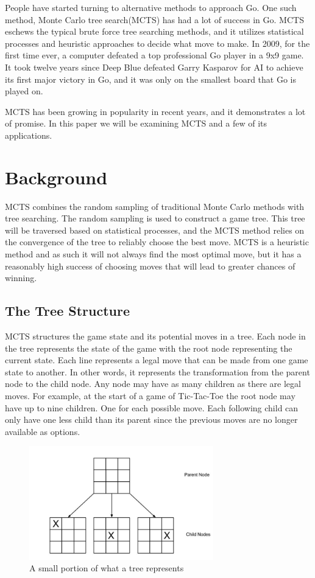 \documentclass{sig-alternate}
\begin{document}
People have started turning to alternative methods to approach Go. One such method, Monte Carlo tree search(MCTS) has had a lot of success in Go. MCTS eschews the typical brute force tree searching methods, and it utilizes statistical processes and heuristic approaches to decide what move to make. In 2009, for the first time ever, a computer defeated a top professional Go player in a 9x9 game\cite{TheGrandChallenge}. It took twelve years since Deep Blue defeated Garry Kasparov for AI to achieve its first major victory in Go, and it was only on the smallest board that Go is played on.

MCTS has been growing in popularity in recent years, and it demonstrates a lot of promise. In this paper we will be examining MCTS and a few of its applications.  
\section{Background}
MCTS combines the random sampling of traditional Monte Carlo methods with tree searching. The random sampling is used to construct a game tree. This tree will be traversed based on statistical processes, and the MCTS method relies on the convergence of the tree to reliably choose the best move. MCTS is a heuristic method and as such it will not always find the most optimal move, but it has a reasonably high success of choosing moves that will lead to greater chances of winning.
\subsection{The Tree Structure}
MCTS structures the game state and its potential moves in a tree. Each node in the tree represents the state of the game with the root node representing the current state. Each line represents a legal move that can be made from one game state to another. In other words, it represents the transformation from the parent node to the child node. Any node may have as many children as there are legal moves. For example, at the start of a game of Tic-Tac-Toe the root node may have up to nine children. One for each possible move. Each following child can only have one less child than its parent since the previous moves are no longer available as options.
\begin{figure}[h]
\includegraphics[width=8cm]{TicTacToeTree.jpg}
\centering
\caption{A small portion of what a tree represents}
\label{fig:TicTacToe}
\end{figure}
\end{document}
